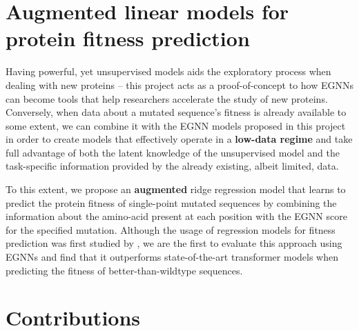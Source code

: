 \section{Augmented linear models for protein fitness prediction}

Having powerful, yet unsupervised models aids the exploratory process when dealing with new proteins – this project acts as a proof-of-concept to how EGNNs can become tools that help researchers accelerate the study of new proteins. Conversely, when data about a mutated sequence's fitness is already available to some extent, we can combine it with the EGNN models proposed in this project in order to create models that effectively operate in a \textbf{low-data regime} and take full advantage of both the latent knowledge of the unsupervised model and the task-specific information provided by the already existing, albeit limited, data. 

To this extent, we propose an \textbf{augmented} ridge regression model that learns to predict the protein fitness of single-point mutated sequences by combining the information about the amino-acid present at each position with the EGNN score for the specified mutation. Although the usage of regression models for fitness prediction was first studied by \citet{chloe-hsu}, we are the first to evaluate this approach using EGNNs and find that it outperforms state-of-the-art transformer models when predicting the fitness of better-than-wildtype sequences. 

\section{Contributions}
